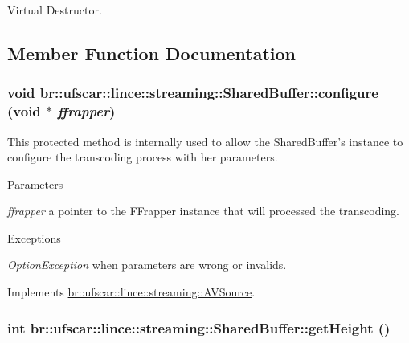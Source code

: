 Virtual Destructor. 



\subsection{Member Function Documentation}
\hypertarget{classbr_1_1ufscar_1_1lince_1_1streaming_1_1SharedBuffer_a7479737f634864d9d5756eb41c68cec3}{
\subsubsection[{configure}]{\setlength{\rightskip}{0pt plus 5cm}void br::ufscar::lince::streaming::SharedBuffer::configure (void $\ast$ {\em ffrapper})}}
\label{classbr_1_1ufscar_1_1lince_1_1streaming_1_1SharedBuffer_a7479737f634864d9d5756eb41c68cec3}


This protected method is internally used to allow the SharedBuffer's instance to configure the transcoding process with her parameters. 


\begin{DoxyParams}{Parameters}
\item[{\em ffrapper}]a pointer to the FFrapper instance that will processed the transcoding. \end{DoxyParams}

\begin{DoxyExceptions}{Exceptions}
\item[{\em OptionException}]when parameters are wrong or invalids. \end{DoxyExceptions}


Implements \hyperlink{classbr_1_1ufscar_1_1lince_1_1streaming_1_1AVSource_a728f6eaeafe68040ccd8424627658db3}{br::ufscar::lince::streaming::AVSource}.

\hypertarget{classbr_1_1ufscar_1_1lince_1_1streaming_1_1SharedBuffer_aee8fc805662cb56cb5842f6ed090b138}{
\subsubsection[{getHeight}]{\setlength{\rightskip}{0pt plus 5cm}int br::ufscar::lince::streaming::SharedBuffer::getHeight ()}}
\label{classbr_1_1ufscar_1_1lince_1_1streaming_1_1SharedBuffer_aee8fc805662cb56cb5842f6ed090b138}



